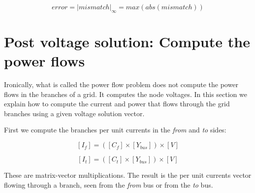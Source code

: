 \documentclass[nols,a4paper,twoside,notoc,fleqn]{tufte-book}
\begin{document}
\begin{equation}
error = |mismatch|_\infty = max(abs(mismatch))
\end{equation}


\newpage
\section{Post voltage solution: Compute the power flows} \label{post_voltage_solution}

Ironically, what is called the power flow problem does not compute the power flows in the branches of a grid. It computes the node voltages. In this section we explain how to compute the current and power that flows through the grid branches using a given voltage solution vector.




First we compute the branches per unit currents in the \textit{from} and \textit{to} sides:

\begin{equation}
{[I_f] = ([C_f] \times [Y_{bus}]) \times [V]}
\end{equation}

\begin{equation}
{[I_t] = ([C_t] \times [Y_{bus}]) \times [V]}
\end{equation}


These are matrix-vector multiplications. The result is the per unit currents vector flowing through a branch, seen from the \textit{from} bus or from the \textit{to} bus.
\end{document}
